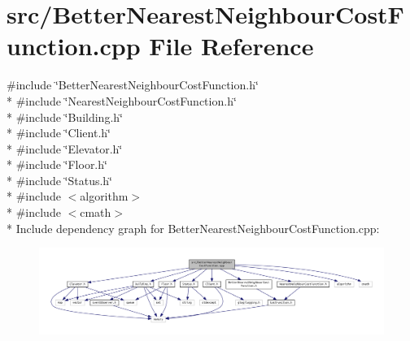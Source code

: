 \section{src/\+Better\+Nearest\+Neighbour\+Cost\+Function.cpp File Reference}
\label{_better_nearest_neighbour_cost_function_8cpp}
{\ttfamily \#include \char`\"{}Better\+Nearest\+Neighbour\+Cost\+Function.\+h\char`\"{}}\\*
{\ttfamily \#include \char`\"{}Nearest\+Neighbour\+Cost\+Function.\+h\char`\"{}}\\*
{\ttfamily \#include \char`\"{}Building.\+h\char`\"{}}\\*
{\ttfamily \#include \char`\"{}Client.\+h\char`\"{}}\\*
{\ttfamily \#include \char`\"{}Elevator.\+h\char`\"{}}\\*
{\ttfamily \#include \char`\"{}Floor.\+h\char`\"{}}\\*
{\ttfamily \#include \char`\"{}Status.\+h\char`\"{}}\\*
{\ttfamily \#include $<$algorithm$>$}\\*
{\ttfamily \#include $<$cmath$>$}\\*
Include dependency graph for Better\+Nearest\+Neighbour\+Cost\+Function.\+cpp\+:
\nopagebreak
\begin{figure}[H]
\begin{center}
\leavevmode
\includegraphics[width=350pt]{_better_nearest_neighbour_cost_function_8cpp__incl}
\end{center}
\end{figure}
